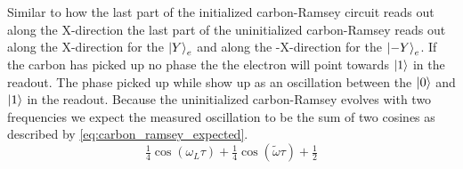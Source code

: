 Similar to how the last part of the initialized carbon-Ramsey circuit reads out along the X-direction the last part of the uninitialized carbon-Ramsey reads out along the X-direction for the ${\left\vert{Y}\right\rangle}_e$ and along the -X-direction for the ${\left\vert{-Y}\right\rangle}_e$.
If the carbon has picked up no phase the the electron will point towards ${\left\vert{1}\right\rangle}$ in the readout.
The phase picked up while show up as an oscillation between the ${\left\vert{0}\right\rangle}$ and ${\left\vert{1}\right\rangle}$ in the readout.
Because the uninitialized carbon-Ramsey evolves with two frequencies we expect the measured oscillation to be the sum of two cosines as described by \cref{eq:carbon_ramsey_expected}.
\begin{equation}
    \tfrac{1}{4} \cos(\omega_L \tau ) +\tfrac{1}{4}  \cos (\tilde{\omega} \tau ) + \tfrac{1}{2}
    \label{eq:carbon_ramsey_expected}
\end{equation}

